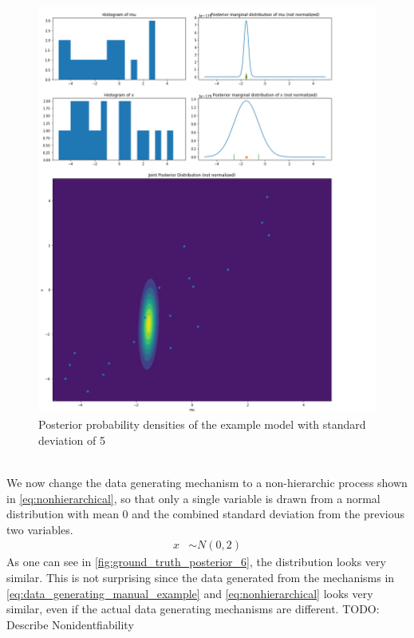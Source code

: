 \documentclass{article}
\begin{document}
\begin{figure}
	\includegraphics[width=\textwidth]{images/ground_truth_posterior_4_cut.png}
	\caption[Posterior probability densities of the example model with standard deviation of 5]{Posterior probability densities of the example model with standard deviation of 5}
	\label{fig:ground_truth_posterior_4}
\end{figure}
\\
We now change the data generating mechanism to a non-hierarchic process shown in \autoref{eq:nonhierarchical}, so that only a single variable is drawn from a normal distribution with mean 0 and the combined standard deviation from the previous two variables.
\begin{equation}
\label{eq:nonhierarchical}
\begin{split}
x &\sim N(0,2)
\end{split}
\end{equation}
As one can see in \autoref{fig:ground_truth_posterior_6}, the distribution looks very similar. This is not surprising since the data generated from the mechanisms in \autoref{eq:data_generating_manual_example} and \autoref{eq:nonhierarchical} looks very similar, even if the actual data generating mechanisms are different. TODO: Describe Nonidentfiability
\end{document}
